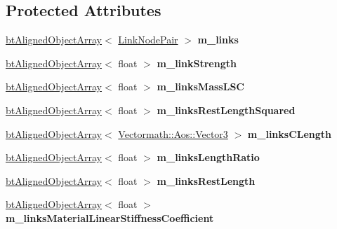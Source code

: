 \subsection*{Protected Attributes}
\begin{DoxyCompactItemize}
\item 
\mbox{\label{classbtSoftBodyLinkData_a6371f37d378523bcc44ba8831ca6e3ab}} 
\hyperlink{classbtAlignedObjectArray}{bt\+Aligned\+Object\+Array}$<$ \hyperlink{classbtSoftBodyLinkData_1_1LinkNodePair}{Link\+Node\+Pair} $>$ {\bfseries m\+\_\+links}
\item 
\mbox{\label{classbtSoftBodyLinkData_a98d439b5be7538d52790bb3410022648}} 
\hyperlink{classbtAlignedObjectArray}{bt\+Aligned\+Object\+Array}$<$ float $>$ {\bfseries m\+\_\+link\+Strength}
\item 
\mbox{\label{classbtSoftBodyLinkData_a5391428068e3639ed57324c13ccd727d}} 
\hyperlink{classbtAlignedObjectArray}{bt\+Aligned\+Object\+Array}$<$ float $>$ {\bfseries m\+\_\+links\+Mass\+L\+SC}
\item 
\mbox{\label{classbtSoftBodyLinkData_a1c87a39609eb7e1225e7d7bd13bbdea5}} 
\hyperlink{classbtAlignedObjectArray}{bt\+Aligned\+Object\+Array}$<$ float $>$ {\bfseries m\+\_\+links\+Rest\+Length\+Squared}
\item 
\mbox{\label{classbtSoftBodyLinkData_aaed5c585bdf764e86b865775aa904f8d}} 
\hyperlink{classbtAlignedObjectArray}{bt\+Aligned\+Object\+Array}$<$ \hyperlink{classVectormath_1_1Aos_1_1Vector3}{Vectormath\+::\+Aos\+::\+Vector3} $>$ {\bfseries m\+\_\+links\+C\+Length}
\item 
\mbox{\label{classbtSoftBodyLinkData_aa1d04f92e08a5996316602c5b07982a7}} 
\hyperlink{classbtAlignedObjectArray}{bt\+Aligned\+Object\+Array}$<$ float $>$ {\bfseries m\+\_\+links\+Length\+Ratio}
\item 
\mbox{\label{classbtSoftBodyLinkData_a3c4ebcde763d925b024c4af0dc390521}} 
\hyperlink{classbtAlignedObjectArray}{bt\+Aligned\+Object\+Array}$<$ float $>$ {\bfseries m\+\_\+links\+Rest\+Length}
\item 
\mbox{\label{classbtSoftBodyLinkData_a4aa6fcb2ce79e71471f63d968645e083}} 
\hyperlink{classbtAlignedObjectArray}{bt\+Aligned\+Object\+Array}$<$ float $>$ {\bfseries m\+\_\+links\+Material\+Linear\+Stiffness\+Coefficient}
\end{DoxyCompactItemize}


